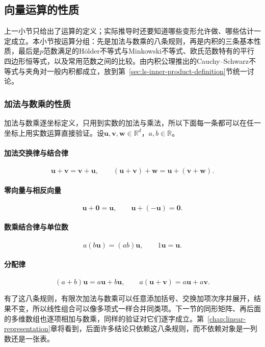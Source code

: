 \subsection{向量运算的性质}
\label{sec:ls-vector-operation-properties}

上一小节只给出了运算的定义；实际推导时还要知道哪些变形允许做、哪些估计一定成立。本小节按运算分组：先是加法与数乘的八条规则，再是内积的三条基本性质，最后是$p$范数满足的Hölder不等式与Minkowski不等式、欧氏范数特有的平行四边形恒等式，以及常用范数之间的比较。由内积公理推出的Cauchy--Schwarz不等式与夹角对一般内积都成立，放到第~\ref{sec:ls-inner-product-definition}节统一讨论。

\subsubsection{加法与数乘的性质}
\label{sec:ls-vector-operation-rules}

加法与数乘逐坐标定义，只用到实数的加法与乘法，所以下面每一条都可以在任一坐标上用实数运算直接验证。设$\bm u,\bm v,\bm w\in\mathbb R^d$，$a,b\in\mathbb R$。

\paragraph{加法交换律与结合律}
\[
 \bm u+\bm v=\bm v+\bm u,\qquad
 (\bm u+\bm v)+\bm w=\bm u+(\bm v+\bm w).
\]

\paragraph{零向量与相反向量}
\[
 \bm u+\bm0=\bm u,\qquad
 \bm u+(-\bm u)=\bm0.
\]

\paragraph{数乘结合律与单位数}
\[
 a(b\bm u)=(ab)\bm u,\qquad
 1\bm u=\bm u.
\]

\paragraph{分配律}
\[
 (a+b)\bm u=a\bm u+b\bm u,\qquad
 a(\bm u+\bm v)=a\bm u+a\bm v.
\]

有了这八条规则，有限次加法与数乘可以任意添加括号、交换加项次序并展开，结果不变，所以线性组合可以像多项式一样合并同类项。下一节的同形矩阵、再后面的多维数组也逐项相加与数乘，同样的验证对它们逐字成立。第~\ref{chap:linear-representation}章将看到，后面许多结论只依赖这八条规则，而不依赖对象是一列数还是一张表。

